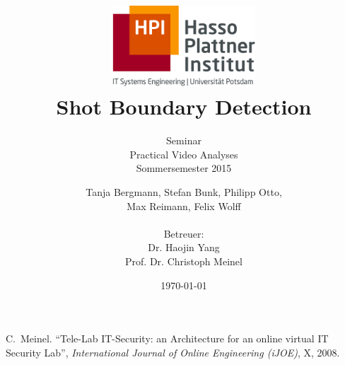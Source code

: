 \documentclass[a4paper,12pt,headsepline,pagesize,bibtotoc,titlepage]{scrartcl}
\title{
	\includegraphics*[width=0.4\textwidth]{images/hpi_logo.png}\\
	\vspace{24pt}
	Shot Boundary Detection
}
\subtitle{
	Seminar\\
	Practical Video Analyses\\
	Sommersemester 2015
}
\author{
	Tanja Bergmann, Stefan Bunk, Philipp Otto, \\
	Max Reimann, Felix Wolff\\ \\[12pt]
	Betreuer:\\
	Dr. Haojin Yang\\
	Prof. Dr. Christoph Meinel
}
\date{\today}
\begin{document}
\maketitle
\tableofcontents
\newpage








\newpage
\begin{thebibliography}{1}

C.~Meinel.
``Tele-Lab IT-Security: an Architecture for an online virtual IT Security Lab'',
\emph{International Journal of Online Engineering (iJOE)},
X, 2008.

\end{thebibliography}
\end{document}
